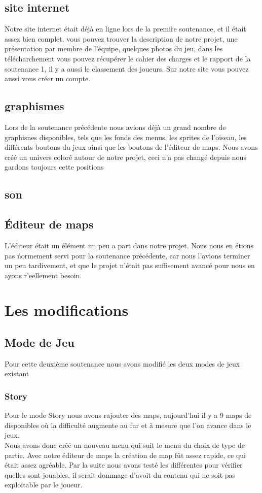 \documentclass [11pt]{report}
\begin{document}
	\section{site internet}
		Notre site internet \'etait d\'ej\`a en ligne lors de la premi\`re soutenance, et il \'etait assez bien complet. vous pouvez trouver la description de notre projet, une pr\'esentation par membre de l'\'equipe, quelques photos du jeu, dans les t\'el\'echarchement vous pouvez r\'ecup\'erer le cahier des charges et le rapport de la soutenance 1, il y a aussi le classement des joueurs. Sur notre site vous pouvez aussi vous cr\'eer un compte.
	\section{graphismes}
		Lors de la soutenance pr\'ec\'edente nous avions d\'ej\`a un grand nombre de graphisnes disponibles, tels que les fonds des menus, les sprites de l'oiseau, les diff\'erents boutons du jeux ainsi que les boutons de l'\'editeur de maps. Nous avons cr\'e\'e un univers color\'e autour de notre projet, ceci n'a pas chang\'e depuis nous gardons toujours cette positions 
	\section{son}
	\section{\'Editeur de maps}
		L'\'editeur \'etait un \'el\'ement un peu a part dans notre projet. Nous nous en \'etions pas \'normement servi pour la soutenance pr\'ec\'edente, car nous l'avions terminer un peu tardivement, et que le projet n'\'etait pas suffisement avanc\'e pour nous en ayons r'eellement besoin.
\chapter{Les modifications}
	\section{Mode de Jeu}
		Pour cette deuxi\`eme soutenance nous avons modifi\'e les deux modes de jeux existant
		\subsection{Story}
			Pour le mode Story nous avons rajouter des maps, aujourd'hui il y a 9 maps de disponibles o\`u la difficult\'e augmente au fur et \`a mesure que l'on avance dans le jeux. \\
			\indent Nous avons donc cr\'e\'e un nouveau menu qui suit le menu du choix de type de partie. Avec notre \'editeur de maps la cr\'eation de map f\^ut assez rapide, ce qui \'etait assez agr\'eable. Par la suite nous avons test\'e les diff\'erentes pour v\'erifier quelles sont jouables, il serait dommage d'avoit du contenu qui ne soit pas exploitable par le joueur.
\end{document}
